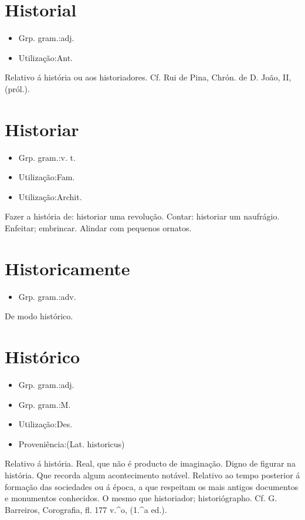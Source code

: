 \documentclass{article}
\begin{document}
\section{Historial}
\begin{itemize}
\item {Grp. gram.:adj.}
\end{itemize}
\begin{itemize}
\item {Utilização:Ant.}
\end{itemize}
Relativo á história ou aos historiadores. Cf. Rui de Pina, \textunderscore Chrón. de D. João\textunderscore , II, (pról.).
\section{Historiar}
\begin{itemize}
\item {Grp. gram.:v. t.}
\end{itemize}
\begin{itemize}
\item {Utilização:Fam.}
\end{itemize}
\begin{itemize}
\item {Utilização:Archit.}
\end{itemize}
Fazer a história de: \textunderscore historiar uma revolução\textunderscore .
Contar: \textunderscore historiar um naufrágio\textunderscore .
Enfeitar; embrincar.
Alindar com pequenos ornatos.
\section{Historicamente}
\begin{itemize}
\item {Grp. gram.:adv.}
\end{itemize}
De modo histórico.
\section{Histórico}
\begin{itemize}
\item {Grp. gram.:adj.}
\end{itemize}
\begin{itemize}
\item {Grp. gram.:M.}
\end{itemize}
\begin{itemize}
\item {Utilização:Des.}
\end{itemize}
\begin{itemize}
\item {Proveniência:(Lat. \textunderscore historicus\textunderscore )}
\end{itemize}
Relativo á história.
Real, que não é producto de imaginação.
Digno de figurar na história.
Que recorda algum acontecimento notável.
Relativo ao tempo posterior á formação das sociedades ou á época, a que respeitam os mais antigos documentos e monumentos conhecidos.
O mesmo que \textunderscore historiador\textunderscore ; historiógrapho. Cf. G. Barreiros, \textunderscore Corografia\textunderscore , fl. 177 v.^o, (1.^a ed.).
\end{document}
